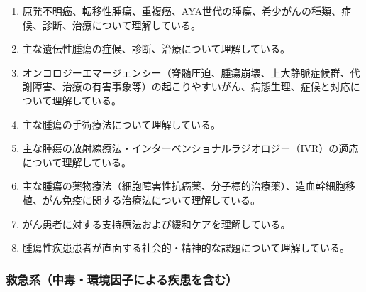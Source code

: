 \begin{enumerate}
\item
  原発不明癌、転移性腫瘍、重複癌、AYA世代の腫瘍、希少がんの種類、症候、診断、治療について理解している。
\item
  主な遺伝性腫瘍の症候、診断、治療について理解している。
\item
  オンコロジーエマージェンシー（脊髄圧迫、腫瘍崩壊、上大静脈症候群、代謝障害、治療の有害事象等）の起こりやすいがん、病態生理、症候と対応について理解している。
\item
  主な腫瘍の手術療法について理解している。
\item
  主な腫瘍の放射線療法・インターベンショナルラジオロジー（IVR）の適応について理解している。
\item
  主な腫瘍の薬物療法（細胞障害性抗癌薬、分子標的治療薬）、造血幹細胞移植、がん免疫に関する治療法について理解している。
\item
  がん患者に対する支持療法および緩和ケアを理解している。
\item
  腫瘍性疾患患者が直面する社会的・精神的な課題について理解している。
\end{enumerate}

\hypertarget{ux6551ux6025ux7cfbux4e2dux6bd2ux74b0ux5883ux56e0ux5b50ux306bux3088ux308bux75beux60a3ux3092ux542bux3080}{%
\subsubsection{救急系（中毒・環境因子による疾患を含む）}\label{ux6551ux6025ux7cfbux4e2dux6bd2ux74b0ux5883ux56e0ux5b50ux306bux3088ux308bux75beux60a3ux3092ux542bux3080}}

